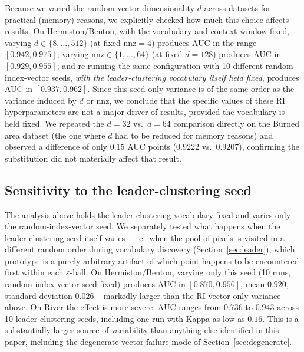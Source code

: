 \documentclass[11pt]{article}
\begin{document}
Because we varied the random vector dimensionality $d$ across datasets for practical (memory) reasons, we explicitly checked how much this choice affects results. On Hermiston/Benton, with the vocabulary and context window fixed, varying $d \in \{8, \dots, 512\}$ (at fixed $\mathrm{nnz}=4$) produces AUC in the range $[0.942, 0.975]$; varying $\mathrm{nnz} \in \{1, \dots, 64\}$ (at fixed $d=128$) produces AUC in $[0.929, 0.955]$; and re-running the same configuration with 10 different random-index-vector seeds, \emph{with the leader-clustering vocabulary itself held fixed}, produces AUC in $[0.937, 0.962]$. Since this seed-only variance is of the same order as the variance induced by $d$ or $\mathrm{nnz}$, we conclude that the specific values of these RI hyperparameters are not a major driver of results, provided the vocabulary is held fixed. We repeated the $d=32$ vs.\ $d=64$ comparison directly on the Burned area dataset (the one where $d$ had to be reduced for memory reasons) and observed a difference of only $0.15$ AUC points (0.9222 vs.\ 0.9207), confirming the substitution did not materially affect that result.

\subsection{Sensitivity to the leader-clustering seed}
\label{sec:leader-seed}

The analysis above holds the leader-clustering vocabulary fixed and varies only the random-index-vector seed. We separately tested what happens when the leader-clustering seed itself varies -- i.e.\ when the pool of pixels is visited in a different random order during vocabulary discovery (Section~\ref{sec:leader}), which prototype is a purely arbitrary artifact of which point happens to be encountered first within each $\varepsilon$-ball. On Hermiston/Benton, varying only this seed (10 runs, random-index-vector seed fixed) produces AUC in $[0.870, 0.956]$, mean $0.920$, standard deviation $0.026$ -- markedly larger than the RI-vector-only variance above. On River the effect is more severe: AUC ranges from $0.736$ to $0.943$ across 10 leader-clustering seeds, including one run with Kappa as low as $0.16$. This is a substantially larger source of variability than anything else identified in this paper, including the degenerate-vector failure mode of Section~\ref{sec:degenerate}.
\end{document}
